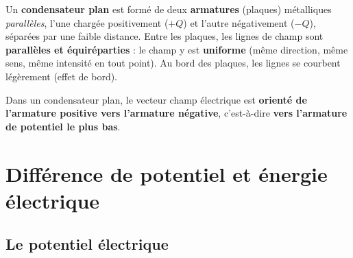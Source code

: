 \documentclass[11pt,a4paper]{article}
\newcommand{\vc}[1]{\vec{#1}}
\begin{document}
\begin{definition}
Un \textbf{condensateur plan} est formé de deux \textbf{armatures} (plaques) métalliques
\emph{parallèles}, l'une chargée positivement ($+Q$) et l'autre négativement ($-Q$), séparées par
une faible distance. Entre les plaques, les lignes de champ sont \textbf{parallèles et
équiréparties} : le champ y est \textbf{uniforme} (même direction, même sens, même intensité en
tout point). Au bord des plaques, les lignes se courbent légèrement (effet de bord).
\end{definition}

\begin{center}
\end{center}

\begin{theoreme}
Dans un condensateur plan, le vecteur champ électrique est \textbf{orienté de l'armature positive
vers l'armature négative}, c'est-à-dire \textbf{vers l'armature de potentiel le plus bas}.
\end{theoreme}

\section{Différence de potentiel et énergie électrique}

\subsection{Le potentiel électrique}
\end{document}
